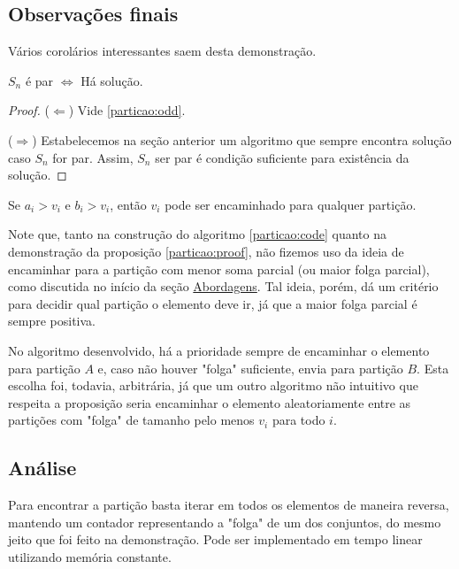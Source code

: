 \subsection*{Observações finais}

Vários corolários interessantes saem desta demonstração.

\begin{cor}
$S_n$ é par $\Leftrightarrow$ Há solução.
\end{cor}
\begin{proof}

($\Leftarrow$) Vide \ref{particao:odd}.

($\Rightarrow$) Estabelecemos na seção anterior um algoritmo que sempre encontra solução caso $S_n$ for par. Assim, $S_n$ ser par é condição suficiente para existência da solução.

\end{proof}

\begin{cor}
Se $a_i > v_i$ e $b_i > v_i$, então $v_i$ pode ser encaminhado para qualquer partição.
\end{cor}

Note que, tanto na construção do algoritmo \ref{particao:code} quanto na demonstração da proposição \ref{particao:proof}, não fizemos uso da ideia de encaminhar para a partição com menor soma parcial (ou maior folga parcial), como discutida no início da seção \hyperref[particao:abordagem]{Abordagens}. Tal ideia, porém, dá um critério para decidir qual partição o elemento deve ir, já que a maior folga parcial é sempre positiva.

No algoritmo desenvolvido, há a prioridade sempre de encaminhar o elemento para partição $A$ e, caso não houver "folga" suficiente, envia para partição $B$. Esta escolha foi, todavia, arbitrária, já que um outro algoritmo não intuitivo que respeita a proposição seria encaminhar o elemento aleatoriamente entre as partições com "folga" de tamanho pelo menos $v_i$ para todo $i$.

\subsection*{Análise}

Para encontrar a partição basta iterar em todos os elementos de maneira reversa, mantendo um contador representando a "folga" de um dos conjuntos, do mesmo jeito que foi feito na demonstração. Pode ser implementado em tempo linear utilizando memória constante.